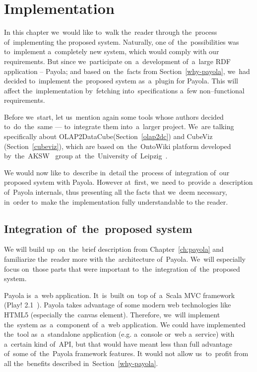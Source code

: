 \chapter{Implementation}
\label{ch:implementation}
In this chapter we~would like to~walk the~reader through the~process of~implementing 
the proposed system. Naturally, one of~the~possibilities was to~implement a~completely new system, 
which would comply with our requirements. But since we~participate on~a~development of~a~large RDF
application -- Payola; and based on~the~facts from
Section~\ref{why-payola}, we~had decided to~implement the~proposed system as~a~plugin
for Payola. This will affect the~implementation by~fetching into~specifications a~few non--functional
requirements.

Before we~start, let us~mention again some tools whose authors decided to~do~the~same --- to~integrate them into~a~larger project. We~are talking specifically about 
OLAP2DataCube(Section~\ref{olap2dc}) and CubeViz (Section~\ref{cubeviz}),
which are based on~the~OntoWiki platform developed by~the~AKSW~\cite{aksw} group at~the~University of~Leipzig~\cite{leipzich-uni}.

We would now like to~describe in~detail the~process of~integration of~our proposed system with
Payola. However at~first, we~need to~provide a~description of~Payola internals, thus presenting all
the facts that we~deem necessary, in~order to~make the~implementation fully understandable to
the reader.

\section{Integration of~the~proposed system}
We will build up~on~the~brief description from Chapter~\ref{ch:payola} and familiarize the~reader
more with the~architecture of~Payola. We~will especially
focus on~those parts that were important to~the~integration of~the~proposed system.

Payola is~a~web application. It~is~built on~top of~a~Scala MVC framework (Play! 2.1~\cite{playfw}).
Payola takes advantage of
some modern web technologies like HTML5 (especially the~canvas element).
Therefore, we~will implement the~system as~a~component of~a~web application.
We could have implemented the~tool as~a~standalone 
application (e.g. a~console or~web a~service) with a~certain kind of~API,
but that would have meant less than full advantage of~some of~the~Payola framework features.
It would not allow us~to~profit from all the~benefits described in~Section~\ref{why-payola}. 

